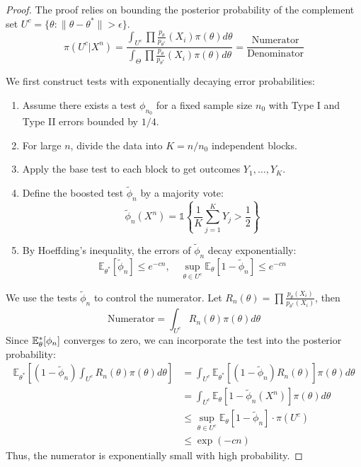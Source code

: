 \begin{proof}
    The proof relies on bounding the posterior probability of the complement set $U^c = \{\theta : \|\theta - \theta^*\| > \epsilon\}$.
$$
\pi(U^c | X^n) = \frac{\int_{U^c} \prod \frac{p_\theta}{p_{\theta^*}}(X_i) \pi(\theta) d\theta}{\int_{\Theta} \prod \frac{p_\theta}{p_{\theta^*}}(X_i) \pi(\theta) d\theta} = \frac{\text{Numerator}}{\text{Denominator}}
$$

We first construct tests with exponentially decaying error probabilities:
\begin{enumerate}
    \item Assume there exists a test $\phi_{n_0}$ for a fixed sample size $n_0$ with Type I and Type II errors bounded by $1/4$.
    \item For large $n$, divide the data into $K = n/n_0$ independent blocks.
    \item Apply the base test to each block to get outcomes $Y_1, \dots, Y_K$.
    \item Define the boosted test $\tilde{\phi}_n$ by a majority vote:
    $$
    \tilde{\phi}_n(X^n) = \mathbb{1}\left\{ \frac{1}{K} \sum_{j=1}^K Y_j > \frac{1}{2} \right\}
    $$
    \item By Hoeffding's inequality, the errors of $\tilde{\phi}_n$ decay exponentially:
    $$
    \mathbb{E}_{\theta^*}[\tilde{\phi}_n] \le e^{-cn}, \quad \sup_{\theta \in U^c} \mathbb{E}_\theta[1 - \tilde{\phi}_n] \le e^{-cn}
    $$
\end{enumerate}
We use the tests $\tilde \phi_n$ to control the numerator. Let $R_n(\theta) = \prod \frac{p_\theta(X_i)}{p_{\theta^*}(X_i)}$, then
$$
\text{Numerator} = \int_{U^c} R_n(\theta) \pi(\theta) d\theta
$$
Since $\mathbb{E}_\theta^*[\phi_n]$ converges to zero, we can incorporate the test into the posterior probability:
\begin{align*}
\mathbb{E}_{\theta^*} \left[ (1 - \tilde\phi_n) \int_{U^c} R_n(\theta) \pi(\theta) d\theta \right] &= \int_{U^c} \mathbb{E}_{\theta^*} [ (1 -\tilde \phi_n) R_n(\theta) ] \pi(\theta) d\theta \\
&= \int_{U^c} \mathbb{E}_{\theta} [ 1 -\tilde \phi_n(X^n) ] \pi(\theta) d\theta \\
&\le \sup_{\theta \in U^c} \mathbb{E}_{\theta} [ 1 -\tilde \phi_n ] \cdot \pi(U^c) \\
&\le \exp(-cn)
\end{align*}
Thus, the numerator is exponentially small with high probability.


\end{proof}
